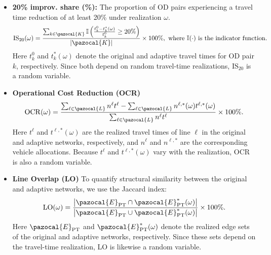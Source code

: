 \documentclass[a4paper,fleqn]{cas-sc}
\begin{document}
\begin{itemize}
    \item \textbf{20\% improv. share (\%):} The proportion of OD pairs experiencing a travel time reduction of at least 20\% under realization $\omega$.
    \begin{align}
        \label{eq:metricIS20}
        \text{IS$_{20}$}(\omega) = \frac{\sum_{k \in \pazocal{K}} \mathbb{I} \left( \frac{t_k^0 - t_k^*(\omega)}{t_k^0} \geq 20\% \right)}{|\pazocal{K}|} \times 100\%, \text{ where } \mathbb{I}(\cdot) \text{ is the indicator function.}
    \end{align}
    Here $t_k^0$ and $t_k^*(\omega)$ denote the original and adaptive travel times for OD pair $k$, respectively. Since both depend on random travel-time realizations, $\text{IS$_{20}$}$ is a random variable.

    \item \textbf{Operational Cost Reduction (OCR)}
\begin{equation}
\label{eq:metricOCR}
\operatorname{OCR}(\omega)
=
\frac{
    \sum_{\ell \in \pazocal{L}} n^\ell t^\ell
    -
    \sum_{\ell \in \pazocal{L}} n^{\ell,*}(\omega) t^{\ell,*}(\omega)
}{
    \sum_{\ell \in \pazocal{L}} n^\ell t^\ell
}
\times 100\%.
\end{equation}
    Here $t^\ell$ and $t^{\ell,*}(\omega)$ are the realized travel times of line $\ell$ in the original and adaptive networks, respectively,
    and $n^\ell$ and $n^{\ell,*}$ are the corresponding vehicle allocations.
    Because $t^\ell$ and $t^{\ell,*}(\omega)$ vary with the realization, OCR is also a random variable.

    \item \textbf{Line Overlap (LO)}
    To quantify structural similarity between the original and adaptive networks, we use the Jaccard index:
\begin{equation}
\label{eq:metricRO}
\operatorname{LO}(\omega)
=
\frac{
    \left| \pazocal{E}_{\mathrm{PT}}
    \cap
    \pazocal{E}_{\mathrm{PT}}^{*}(\omega) \right|
}{
    \left| \pazocal{E}_{\mathrm{PT}}
    \cup
    \pazocal{E}_{\mathrm{PT}}^{*}(\omega) \right|
}
\times 100\%.
\end{equation}
    Here $\pazocal{E}_{\mathrm{PT}}$ and $\pazocal{E}_{\mathrm{PT}}^*(\omega)$ denote the realized edge sets of the original and adaptive networks, respectively.
    Since these sets depend on the travel-time realization, LO is likewise a random variable.

\end{itemize}
\end{document}
